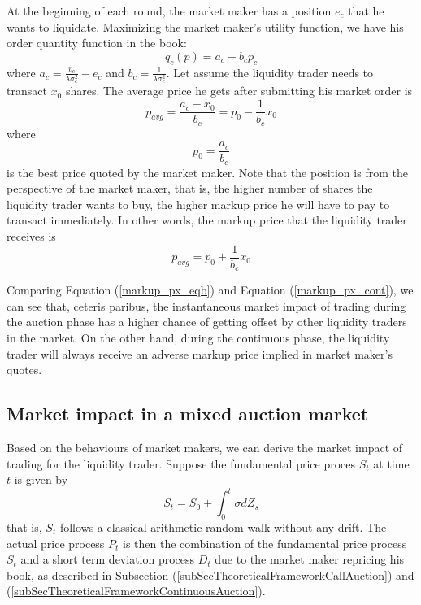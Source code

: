 \documentclass{article}
\begin{document}
At the beginning of each round, the market maker has a position $e_c$ that he wants to liquidate. Maximizing the market maker's utility function, we have his order quantity function in the book:
\[
  q_c(p) = a_c - b_c p_c
\]
where $a_c = \frac{v_c}{\lambda \sigma_c^2} - e_c$ and $b_c=\frac{1}{\lambda \sigma_c^2}$. Let assume the liquidity trader needs to transact $x_0$ shares. The average price he gets after submitting his market order is
\[
  p_{avg} = \frac{a_c-x_0}{b_c}=p_0 - \frac{1}{b_c} x_0
\]
where
\[
  p_0 = \frac{a_c}{b_c}
\]
is the best price quoted by the market maker. Note that the position is from the perspective of the market maker, that is, the higher number of shares the liquidity trader wants to buy, the higher markup price he will have to pay to transact immediately. In other words, the markup price that the liquidity trader receives is
\begin{equation}\label{markup_px_cont}
  p_{avg} = p_0 + \frac{1}{b_c} x_0
\end{equation}

Comparing Equation (\ref{markup_px_eqb}) and Equation (\ref{markup_px_cont}), we can see that, ceteris paribus, the instantaneous market impact of trading during the auction phase has a higher chance of getting offset by other liquidity traders in the market. On the other hand, during the continuous phase, the liquidity trader will always receive an adverse markup price implied in market maker's quotes.

\subsection{Market impact in a mixed auction market}

Based on the behaviours of market makers, we can derive the market impact of trading for the liquidity trader. Suppose the fundamental price proces $S_t$ at time $t$ is given by
\[
  S_t = S_0 + \int_0^t \sigma dZ_s
\]
that is, $S_t$ follows a classical arithmetic random walk without any drift. The actual price process $P_t$ is then the combination of the fundamental price process $S_t$ and a short term deviation process $D_t$ due to the market maker repricing his book, as described in Subsection (\ref{subSecTheoreticalFrameworkCallAuction}) and (\ref{subSecTheoreticalFrameworkContinuousAuction}). 
\end{document}
